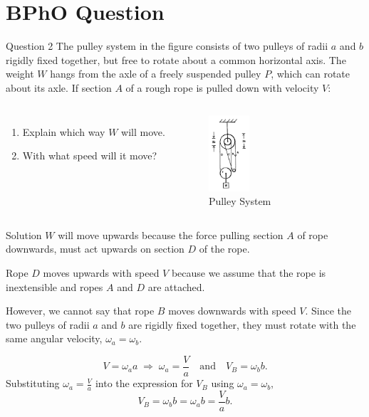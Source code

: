 \documentclass{beamer}
\begin{document}
    

    \section{BPhO Question}

    \begin{frame}{Question 2}
        The pulley system in the figure consists of two pulleys of radii \(a\) and \(b\) rigidly fixed together, but free to rotate about a common horizontal axis. The weight \(W\) hangs from the axle of a freely suspended pulley \(P\), which can rotate about its axle. If section \(A\) of a rough rope is pulled down with velocity \(V\): \pause

        \begin{columns}

                \begin{enumerate}
                    \item Explain which way \(W\) will move. \pause
                    \item With what speed will it move? \pause\\
                \end{enumerate}
            
                \begin{figure}
                    \centering
                    \includegraphics[width=15mm]{z20121b.png}
                    \caption{Pulley System}
                    \label{i1}
                \end{figure}

        \end{columns}
    \end{frame}

    \begin{frame}{Solution}
        \(W\) will move upwards because the force pulling section \(A\) of rope downwards, must act upwards on section \(D\) of the rope.\pause 

        Rope \(D\) moves upwards with speed \(V\) because we assume that the rope is inextensible and ropes \(A\) and \(D\) are attached.\pause

        However, we cannot say that rope \(B\) moves downwards with speed \(V\). Since the two pulleys of radii \(a\) and \(b\) are rigidly fixed together, they must rotate with the same angular velocity, \(\omega_a = \omega_b\).

        \[V = \omega_aa \;\Rightarrow\; \omega_a = \frac{V}{a} \quad\text{and}\quad V_B = \omega_bb.\]\pause
        Substituting \(\omega_a = \frac{V}{a}\) into the expression for \(V_B\) using \(\omega_a = \omega_b,\)
        \[V_B = \omega_bb = \omega_ab = \frac{V}{a}b.\]
    \end{frame}
\end{document}
